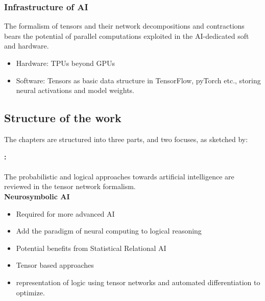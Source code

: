 \subsubsection{Infrastructure of AI}

The formalism of tensors and their network decompositions and contractions bears the potential of parallel computations exploited in the AI-dedicated soft and hardware.
\begin{itemize}
    \item Hardware: TPUs beyond GPUs
    \item Software: Tensors as basic data structure in TensorFlow, pyTorch etc., storing neural activations and model weights.
\end{itemize}



\subsection{Structure of the work}

The chapters are structured into three parts, and two focuses, as sketched by:


\textbf{: \partonetext} \\
\ \\
The probabilistic and logical approaches towards artificial intelligence are reviewed in the tensor network formalism. \\

\textbf{Neurosymbolic AI}
\begin{itemize}
    \item Required for more advanced AI \cite{hochreiter_toward_2022}
    \item Add the paradigm of neural computing to logical reasoning
    \item Potential benefits from Statistical Relational AI \cite{marra_statistical_2024}
    \item Tensor based approaches \cite{cohen_tensorlog_2020}
    \item \cite{badreddine_logic_2022} representation of logic using tensor networks and automated differentiation to optimize.
\end{itemize}


